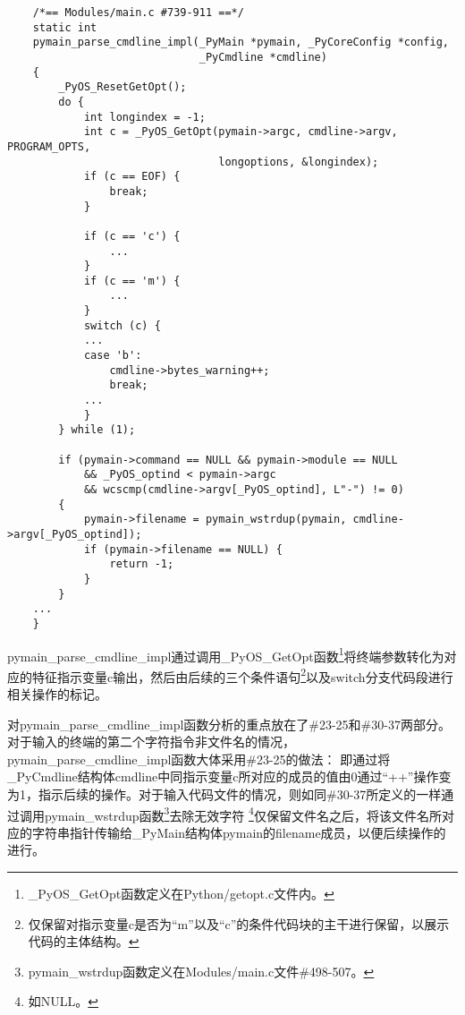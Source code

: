 \documentclass[UTF8]{book}
\begin{document}
\begin{lstlisting}
    /*== Modules/main.c #739-911 ==*/
    static int
    pymain_parse_cmdline_impl(_PyMain *pymain, _PyCoreConfig *config,
                              _PyCmdline *cmdline)
    {
        _PyOS_ResetGetOpt();
        do {
            int longindex = -1;
            int c = _PyOS_GetOpt(pymain->argc, cmdline->argv, PROGRAM_OPTS,
                                 longoptions, &longindex);
            if (c == EOF) {
                break;
            }

            if (c == 'c') {
                ...
            }
            if (c == 'm') {
                ...
            }
            switch (c) {
            ...
            case 'b':
                cmdline->bytes_warning++;
                break;
            ...
            }
        } while (1);

        if (pymain->command == NULL && pymain->module == NULL
            && _PyOS_optind < pymain->argc
            && wcscmp(cmdline->argv[_PyOS_optind], L"-") != 0)
        {
            pymain->filename = pymain_wstrdup(pymain, cmdline->argv[_PyOS_optind]);
            if (pymain->filename == NULL) {
                return -1;
            }
        }
    ...
    }

\end{lstlisting}\par
pymain\_parse\_cmdline\_impl通过调用\_PyOS\_GetOpt函数\footnote[1]{\_PyOS\_GetOpt函数定义在Python/getopt.c文件内。}将终端参数转化为对应的特征指示变量c输出，然后由后续的三个条件语句\footnote[2]{
仅保留对指示变量c是否为“m”以及“c”的条件代码块的主干进行保留，以展示代码的主体结构。
}以及switch分支代码段进行相关操作的标记。\par
对pymain\_parse\_cmdline\_impl函数分析的重点放在了\#23-25和\#30-37两部分。对于输入的终端的第二个字符指令非文件名的情况，pymain\_parse\_cmdline\_impl函数大体采用\#23-25的做法：
即通过将\_PyCmdline结构体cmdline中同指示变量c所对应的成员的值由0通过“++”操作变为1，指示后续的操作。对于输入代码文件的情况，则如同\#30-37所定义的一样通过调用pymain\_wstrdup函数\footnote[3]{pymain\_wstrdup函数定义在Modules/main.c文件\#498-507。}去除无效字符
\footnote[4]{如NULL。}仅保留文件名之后，将该文件名所对应的字符串指针传输给\_PyMain结构体pymain的filename成员，以便后续操作的进行。\par

\end{document}
